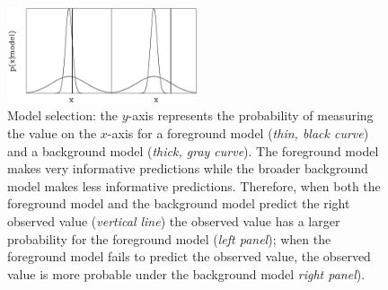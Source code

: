\clearpage
\begin{figure}
\begin{center}
\includegraphics[width=0.5\textwidth]{figs_groups/model_selection.eps}
\end{center}
\caption[Model selection]{Model selection: the $y$-axis represents the
  probability of measuring the value on the $x$-axis for a foreground
  model (\emph{thin, black curve}) and a background model
  (\emph{thick, gray curve}). The foreground model makes very
  informative predictions while the broader background model makes
  less informative predictions. Therefore, when both the foreground
  model and the background model predict the right observed value
  (\emph{vertical line}) the observed value has a larger probability
  for the foreground model (\emph{left panel}); when the foreground
  model fails to predict the observed value, the observed value is
  more probable under the background model \emph{right
  panel}).}\label{fig:model_selection}
\end{figure}

